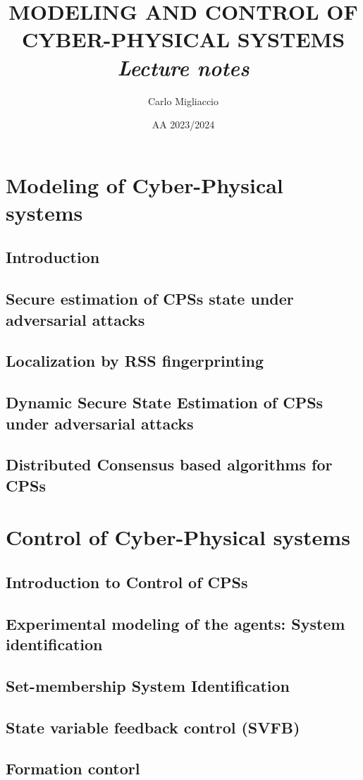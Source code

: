 \documentclass[a4paper, 12pt]{report}
\title{
    \textbf{  \Huge{  MODELING AND  CONTROL OF\\ 
    CYBER-PHYSICAL SYSTEMS } }\\
    \textit{Lecture notes}
}
\author{Carlo Migliaccio}
\date{AA 2023/2024}
\begin{document}
\maketitle
\tableofcontents

\part{Modeling of Cyber-Physical systems}
\chapter{Introduction}


\chapter{Secure estimation of CPSs state under adversarial attacks}


\chapter{Localization by RSS fingerprinting}


\chapter {Dynamic Secure State Estimation of CPSs under adversarial attacks}


\chapter{Distributed Consensus based algorithms for CPSs}



\part{Control of Cyber-Physical systems}
\chapter{Introduction to Control of CPSs}


\chapter{Experimental modeling of the agents: System identification}


\chapter{Set-membership System Identification}


\chapter{State variable feedback control (SVFB)}

\chapter{Formation contorl}
\end{document}
